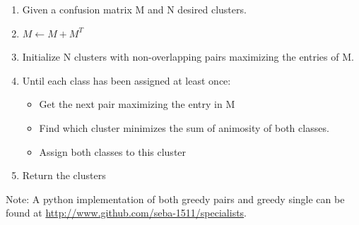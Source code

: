 \documentclass[12pt]{article}
\begin{document}
\begin{enumerate}
\def\labelenumi{\arabic{enumi}.}
\itemsep1pt\parskip0pt
\item
  Given a confusion matrix M and N desired clusters.
\item
  $M \leftarrow M + M^T$
\item
  Initialize N clusters with non-overlapping pairs maximizing the
  entries of M.
\item
  Until each class has been assigned at least once:

  \begin{itemize}
  \itemsep1pt\parskip0pt
  \item
    Get the next pair maximizing the entry in M
  \item
    Find which cluster minimizes the sum of animosity of both classes.
  \item
    Assign both classes to this cluster
  \end{itemize}
\item
  Return the clusters
\end{enumerate}

Note: A python implementation of both greedy pairs and greedy single can
be found at \url{http://www.github.com/seba-1511/specialists}.




\end{document}
